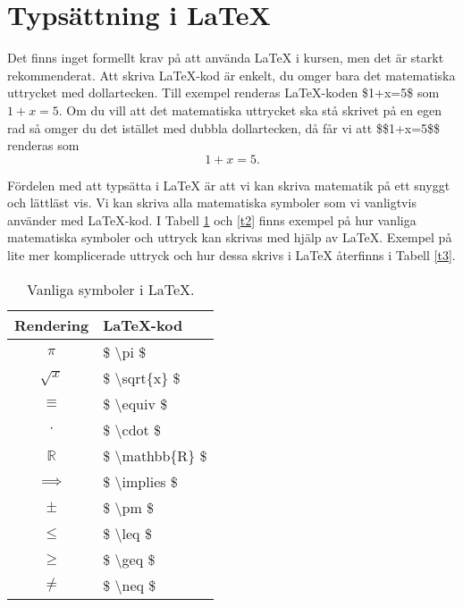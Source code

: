 \documentclass[titlepage]{article}
\begin{document}

\section{Typsättning i \LaTeX}

Det finns inget formellt krav på att använda \LaTeX$ $ i kursen, men det är starkt rekommenderat. Att skriva \LaTeX-kod är enkelt, du omger bara det matematiska uttrycket med dollartecken. Till exempel renderas \LaTeX-koden \$1+x=5\$ som $1+x=5$. Om du vill att det matematiska uttrycket ska stå skrivet på en egen rad så omger du det istället med dubbla dollartecken, då får vi att \$\$1+x=5\$\$ renderas som $$1+x=5.$$

Fördelen med att typsätta i \LaTeX$ $ är att vi kan skriva matematik på ett snyggt och lättläst vis. Vi kan skriva alla matematiska symboler som vi vanligtvis använder med \LaTeX-kod. I Tabell \ref{t1} och \ref{t2} finns exempel på hur vanliga matematiska symboler och uttryck kan skrivas med hjälp av \LaTeX. Exempel på lite mer komplicerade uttryck och hur dessa skrivs i \LaTeX$ $ återfinns i Tabell \ref{t3}.

\begin{table}
    \begin{center}
        \begin{tabular}{| c | l |}
            \hline 
            \textbf{Rendering} & \textbf{\LaTeX-kod} \\
            \hline
            $\pi$ & \$ \textbackslash pi \$ \\
            \hline
            $\sqrt{ x }$ & \$ \textbackslash sqrt\{x\} \$ \\
            \hline
            $\equiv$ & \$ \textbackslash equiv \$ \\
            \hline
            $\cdot$ & \$ \textbackslash cdot \$ \\
            \hline
            $\mathbb{R}$ & \$ \textbackslash mathbb\{R\} \$ \\
            \hline
            $\implies$ & \$ \textbackslash implies \$ \\
            \hline
            $\pm$ & \$ \textbackslash pm \$ \\
            \hline
            $\leq$ & \$ \textbackslash leq \$ \\
            \hline
            $\geq$ & \$ \textbackslash geq \$ \\
            \hline
            $\neq$ & \$ \textbackslash neq \$ \\
            \hline
        \end{tabular}
        \caption{Vanliga symboler i \LaTeX.}
        \label{t1}
    \end{center}
\end{table}
\end{document}
